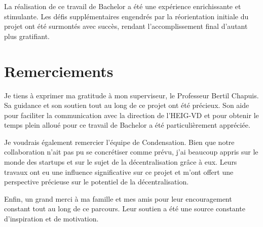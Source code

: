 La réalisation de ce travail de Bachelor a été une expérience enrichissante et stimulante. Les défis supplémentaires engendrés par la réorientation initiale du projet ont été surmontés avec succès, rendant l'accomplissement final d'autant plus gratifiant.

\section{Remerciements}

Je tiens à exprimer ma gratitude à mon superviseur, le Professeur Bertil Chapuis. Sa guidance et son soutien tout au long de ce projet ont été précieux. Son aide pour faciliter la communication avec la direction de l'HEIG-VD et pour obtenir le temps plein alloué pour ce travail de Bachelor a été particulièrement appréciée.

Je voudrais également remercier l'équipe de Condensation. Bien que notre collaboration n'ait pas pu se concrétiser comme prévu, j'ai beaucoup appris sur le monde des startups et sur le sujet de la décentralisation grâce à eux. Leurs travaux ont eu une influence significative sur ce projet et m'ont offert une perspective précieuse sur le potentiel de la décentralisation.

Enfin, un grand merci à ma famille et mes amis pour leur encouragement constant tout au long de ce parcours. Leur soutien a été une source constante d'inspiration et de motivation.

\hspace{8cm}\makeatletter\@author\makeatother\par
\hspace{8cm}\begin{minipage}{5cm}
\end{minipage}
\printsignature